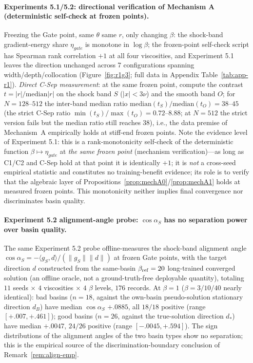 \documentclass[11pt]{article}
\numberwithin{equation}{section}
\begin{document}
\paragraph{Experiments 5.1/5.2: directional verification of Mechanism A (deterministic self-check at frozen points).}
Freezing the Gate point, same $\theta$ same $r$, only changing $\beta$: the shock-band gradient-energy share $\eta_{gate}$ is monotone in $\log\beta$; the frozen-point self-check script has Spearman rank correlation $+1$ at all four viscosities, and Experiment 5.1 leaves the direction unchanged across 7 configurations spanning width/depth/collocation (Figure~\ref{fig:r1g3}; full data in Appendix Table~\ref{tab:app-r1}). \emph{Direct C-Sep measurement}: at the same frozen point, compute the contrast $t=|r|/\mathrm{median}|r|$ on the shock band $S$ ($|x|<3\nu$) and the smooth band $O$; for $N=128$--$512$ the inter-band median ratio $\mathrm{median}(t_S)/\mathrm{median}(t_O)=38$--$45$ (the strict C-Sep ratio $\min(t_S)/\max(t_O)=0.72$--$8.88$; at $N=512$ the strict version fails but the median ratio still reaches $38$), i.e., the data premise of Mechanism~A empirically holds at stiff-end frozen points. Note the evidence level of Experiment 5.1: this is a rank-monotonicity self-check of the deterministic function $\beta\mapsto\eta_{gate}$ at \emph{the same frozen point} (mechanism verification)---as long as C1/C2 and C-Sep hold at that point it is identically $+1$; it is \emph{not} a cross-seed empirical statistic and constitutes no training-benefit evidence; its role is to verify that the algebraic layer of Propositions~\ref{prop:mechA0}/\ref{prop:mechA1} holds at measured frozen points. This monotonicity neither implies final convergence nor discriminates basin quality.

\paragraph{Experiment 5.2 alignment-angle probe: $\cos\alpha_S$ has no separation power over basin quality.}
The same Experiment 5.2 probe offline-measures the shock-band alignment angle $\cos\alpha_S=-\langle g_S,d\rangle/(\|g_S\|\|d\|)$ at frozen Gate points, with the target direction $d$ constructed from the same-basin $\beta_{\rm ref}=20$ long-trained converged solution (an offline oracle, not a ground-truth-free deployable quantity), totaling $11$ seeds $\times$ $4$ viscosities $\times$ $4$ $\beta$ levels, $176$ records. At $\beta=1$ ($\beta=3/10/40$ nearly identical): bad basins ($n=18$, against the own-basin pseudo-solution stationary direction $d_B$) have median $\cos\alpha_S$ $+.0885$, all $18/18$ positive (range $[+.007,+.461]$); good basins ($n=26$, against the true-solution direction $d_*$) have median $+.0047$, $24/26$ positive (range $[-.0045,+.594]$). The sign distributions of the alignment angles of the two basin types show no separation; this is the empirical source of the discrimination-boundary conclusion of Remark~\ref{rem:align-emp}.
\end{document}
